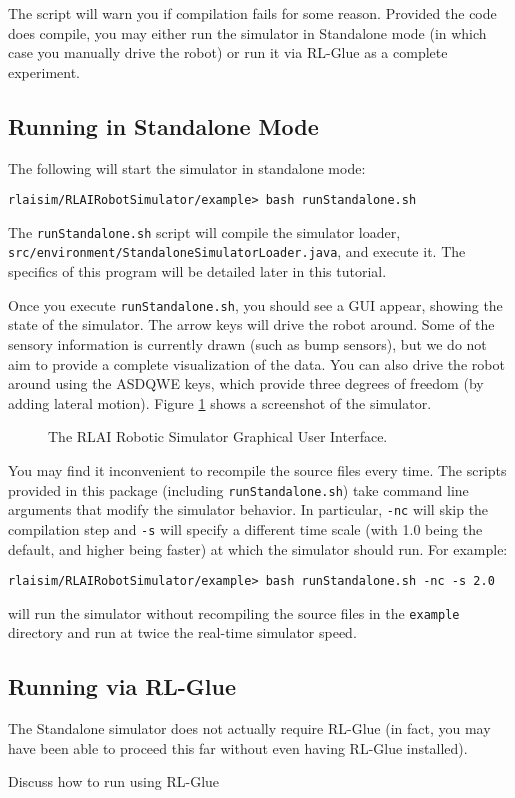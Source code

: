 \documentclass[12pt]{article}
\newcommand{\code}[1]{\texttt{#1}}
\begin{document}
The script will warn you if compilation fails for some reason. Provided the
code does compile, you may either run the simulator in Standalone mode
(in which case you manually drive the robot) or run it via RL-Glue as a 
complete experiment.

\subsection{Running in Standalone Mode}\label{subsec:standalone}

The following will start the simulator in standalone mode:

\begin{verbatim}
rlaisim/RLAIRobotSimulator/example> bash runStandalone.sh 
\end{verbatim}

The \verb+runStandalone.sh+ script will compile the simulator loader,
\verb+src/environment/StandaloneSimulatorLoader.java+, and execute it. The 
specifics of this program will be detailed later in this tutorial.

Once you execute \verb+runStandalone.sh+, you should see a GUI appear, showing
the state of the simulator. The arrow keys will drive the robot around. Some 
of the
sensory information is currently drawn (such as bump sensors), but we do not
aim to provide a complete visualization of the data. You can also drive the
robot around using the ASDQWE keys, which provide three degrees of freedom
(by adding lateral motion). Figure \ref{fig:gui} shows a screenshot of
the simulator.

\begin{figure}\label{fig:gui}
\centerline{
}
\caption{The RLAI Robotic Simulator Graphical User Interface.}
\end{figure}

You may find it inconvenient to recompile the source files every time. The
scripts provided in this package (including \code{runStandalone.sh}) take
command line arguments that modify the simulator behavior. In particular,
\code{-nc} will skip the compilation step and \code{-s} will specify a 
different time scale (with 1.0 being the default, and higher being faster)
at which the simulator should run. For example:

\begin{verbatim}
rlaisim/RLAIRobotSimulator/example> bash runStandalone.sh -nc -s 2.0
\end{verbatim}

will run the simulator without recompiling the source files in the
\code{example} directory and run at twice the real-time simulator speed.

\subsection{Running via RL-Glue}

The Standalone simulator does not actually require RL-Glue (in fact, you 
may have been able to proceed this far without even having RL-Glue installed).

Discuss how to run using RL-Glue
\end{document}
